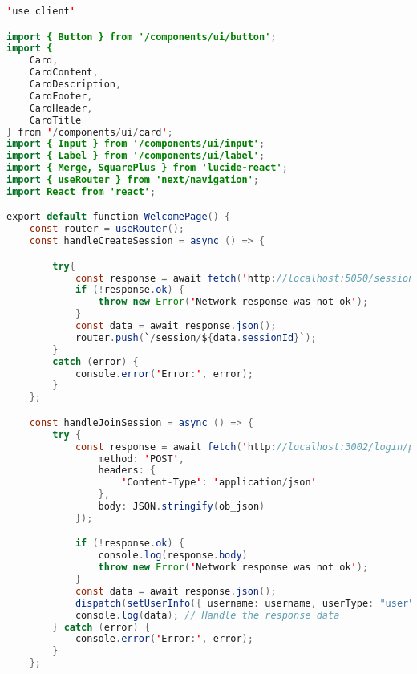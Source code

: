 \begin{lstlisting}[language=Java, caption={Welcome Page}, label={lst:java}]
'use client'

import { Button } from '/components/ui/button';
import {
    Card,
    CardContent,
    CardDescription,
    CardFooter,
    CardHeader,
    CardTitle
} from '/components/ui/card';
import { Input } from '/components/ui/input';
import { Label } from '/components/ui/label';
import { Merge, SquarePlus } from 'lucide-react';
import { useRouter } from 'next/navigation';
import React from 'react';

export default function WelcomePage() {
    const router = useRouter();
    const handleCreateSession = async () => {

        try{
            const response = await fetch('http://localhost:5050/session', {method:'POST'});
            if (!response.ok) {
                throw new Error('Network response was not ok');
            }
            const data = await response.json();
            router.push(`/session/${data.sessionId}`);
        }
        catch (error) {
            console.error('Error:', error);
        }
    };

    const handleJoinSession = async () => {
        try {
            const response = await fetch('http://localhost:3002/login/participant', {
                method: 'POST',
                headers: {
                    'Content-Type': 'application/json'
                },
                body: JSON.stringify(ob_json)
            });

            if (!response.ok) {
                console.log(response.body)
                throw new Error('Network response was not ok');
            }
            const data = await response.json();
            dispatch(setUserInfo({ username: username, userType: "user", isLoggedIn: true, sessionId: sessionId }));
            console.log(data); // Handle the response data
        } catch (error) {
            console.error('Error:', error);
        }
    };


\end{lstlisting}
